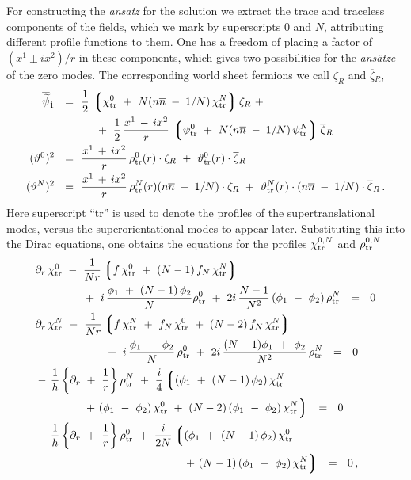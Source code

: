 \documentclass[12pt]{article}
\newcommand{\p}{\partial}
\newcommand{\wt}{\widetilde}
\newcommand{\ov}{\overline}
\newcommand{\lgr}{\left\lgroup}
\newcommand{\rgr}{\right\rgroup}
\newcommand{\bzr}{\ov{\zeta}{}_R}
\newcommand{\zr}{\zeta_R}
\newcommand{\nbar}{\ov{n}}
\newcommand{\pts}{\psi_{\rm tr}^0}
\newcommand{\ptN}{\psi_{\rm tr}^N}
\newcommand{\cts}{\chi_{\rm tr}^0}
\newcommand{\ctN}{\chi_{\rm tr}^N}
\newcommand{\tts}{\vartheta_{\rm tr}^0}
\newcommand{\ttN}{\vartheta_{\rm tr}^N}
\newcommand{\rts}{\rho_{\rm tr}^0}
\newcommand{\rtN}{\rho_{\rm tr}^N}
\begin{document}
For constructing the {\it ansatz} for the solution we extract the trace and traceless components of the
fields, which we mark by superscripts $0$ and $N$, attributing different profile functions to them. 
One has a freedom of placing a factor of $ (x^1 \pm ix^2)/r $ in these components, which gives two possibilities
for the {\it ans\"atze} of the zero modes.
The corresponding world sheet fermions we call $ \zr $ and $ \bzr $,
\begin{align*}
%
	\ov{\wt{\psi}}{}_{\dot 1} ~~=~~ & \frac{1}{2}\, \lgr \cts ~+~ N (n\nbar \;-\; 1/N)\,\ctN \rgr \zr ~+~ \\
%
	& 
		\quad~+~
		\frac{1}{2}\, \frac{x^1 \,-\, ix^2}{r}\, \lgr \pts ~+~ N(n\nbar \;-\; 1/N)\, \ptN \rgr \bzr \\
%
	(\vartheta^0)^2 ~~=~~ &
		\frac{x^1 \,+\, ix^2}{r}\, \rts(r)\cdot \zr 
		~+~ \tts(r)\cdot \bzr \\
%
	(\vartheta^N)^2 ~~=~~ &
		\frac{x^1 \,+\, ix^2}{r}\,\rtN(r) (n\nbar \;-\; 1/N) \cdot \zr 
		~+~ \ttN(r)\cdot (n\nbar \;-\; 1/N) \cdot \bzr \,.
\end{align*}
Here superscript ``tr'' is used to denote the profiles of the supertranslational modes, versus the
superorientational modes to appear later.
Substituting this into the Dirac equations, one obtains the equations 
for the profiles 
$ \chi_{\rm tr}^{0,N} $ and $ \rho_{\rm tr}^{0,N} $
\begin{align*}
%
	&
	\p_r\, \cts ~-~ \frac{1}{Nr}\lgr f\,\cts ~+~ (N-1)\, f_N\, \ctN \rgr \\
	&
	\qquad\qquad
		~+~ i\, \frac{ \phi_1 ~+~ (N-1)\,\phi_2}{N} \rts 
		~+~ 2i\, \frac{N-1}{N^2}\, (\phi_1 ~-~ \phi_2)\, \rtN ~~=~~ 0
\\
%
	&
	\p_r\, \ctN ~-~ \frac{1}{Nr} \lgr f\, \ctN ~+~ f_N\, \cts ~+~ (N-2)\,f_N\,\ctN \rgr \\
	& 
	\qquad\qquad\qquad
		~+~ i\, \frac{\phi_1 ~-~ \phi_2}{N}\, \rts 
		~+~ 2i\, \frac{(N-1)\phi_1 ~+~ \phi_2}{N^2}\, \rtN ~~=~~ 0
\\
%
	&
	-\,\frac{1}{h} \left\{ \p_r ~+~ \frac{1}{r} \right\} \rtN 
		~+~ \frac{i}{4} \lgr (\phi_1 ~+~ (N-1)\,\phi_2)\,\ctN \right. \\
	&
	\qquad\qquad
		\left.
		~+~ (\phi_1~-~\phi_2)\,\cts ~+~ (N-2)\,(\phi_1~-~\phi_2)\,\ctN \rgr ~~=~~ 0
\\
%
	&
	-\,\frac{1}{h} \left\{ \p_r ~+~ \frac{1}{r} \right\} \rts 
		~+~ \frac{i}{2N} \lgr (\phi_1 ~+~ (N-1)\,\phi_2)\,\cts \right. \\
	&
	\qquad\qquad\qquad\qquad\qquad\qquad\quad
		\left.
		~+~ (N-1)\,(\phi_1~-~\phi_2)\,\ctN \rgr ~~=~~0\,,
\end{align*}
\end{document}
